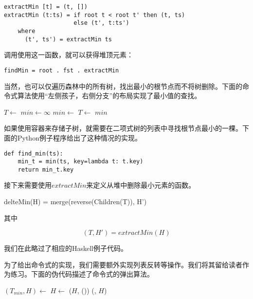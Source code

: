 \documentclass[UTF8]{article}
\begin{document}
\lstset{language=Haskell}
\begin{lstlisting}[style=Haskell]
extractMin [t] = (t, [])
extractMin (t:ts) = if root t < root t' then (t, ts)
                    else (t', t:ts')
    where
      (t', ts') = extractMin ts
\end{lstlisting}

调用使用这一函数，就可以获得堆顶元素：

\begin{lstlisting}[style=Haskell]
findMin = root . fst . extractMin
\end{lstlisting}

当然，也可以仅遍历森林中的所有树，找出最小的根节点而不将树删除。下面的命令式算法使用“左侧孩子，右侧分支”的布局实现了最小值的查找。

\begin{algorithmic}[1]
  \State $T \gets $ 
  \State $min \gets \infty$
      \State $min \gets $ 
    \EndIf
    \State $T \gets $ 
  \EndWhile
  \State \Return $min$
\EndFunction
\end{algorithmic}

如果使用容器来存储子树，就需要在二项式树的列表中寻找根节点最小的一棵。下面的Python例子程序给出了这种情况的实现。

\lstset{language=Python}
\begin{lstlisting}
def find_min(ts):
    min_t = min(ts, key=lambda t: t.key)
    return min_t.key
\end{lstlisting}

接下来需要使用$extractMin$来定义从堆中删除最小元素的函数。

\be
delteMin(H) = merge(reverse(Children(T)), H')
\ee

其中

\[
  (T, H') = extractMin(H)
\]

我们在此略过了相应的Haskell例子代码。

为了给出命令式的实现，我们需要额外实现列表反转等操作。我们将其留给读者作为练习。下面的伪代码描述了命令式的弹出算法。

\begin{algorithmic}[1]
  \State $(T_{min}, H) \gets$ 
  \State $H \gets$ ($H$, ())
  \State \Return (, $H$)
\EndFunction
\end{algorithmic}
\end{document}
